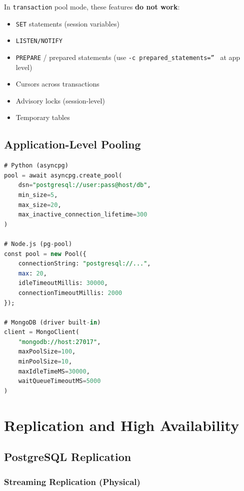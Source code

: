\documentclass[12pt,a4paper]{article}
\begin{document}
\begin{warnbox}
In \texttt{transaction} pool mode, these features \textbf{do not work}:
\begin{itemize}
    \item \texttt{SET} statements (session variables)
    \item \texttt{LISTEN/NOTIFY}
    \item \texttt{PREPARE} / prepared statements (use \texttt{-c prepared\_statements='' } at app level)
    \item Cursors across transactions
    \item Advisory locks (session-level)
    \item Temporary tables
\end{itemize}
\end{warnbox}

\subsection{Application-Level Pooling}

\begin{lstlisting}[language=SQL, caption={Connection pool configuration examples}]
# Python (asyncpg)
pool = await asyncpg.create_pool(
    dsn="postgresql://user:pass@host/db",
    min_size=5,
    max_size=20,
    max_inactive_connection_lifetime=300
)

# Node.js (pg-pool)
const pool = new Pool({
    connectionString: "postgresql://...",
    max: 20,
    idleTimeoutMillis: 30000,
    connectionTimeoutMillis: 2000
});

# MongoDB (driver built-in)
client = MongoClient(
    "mongodb://host:27017",
    maxPoolSize=100,
    minPoolSize=10,
    maxIdleTimeMS=30000,
    waitQueueTimeoutMS=5000
)
\end{lstlisting}


\section{Replication and High Availability}

\subsection{PostgreSQL Replication}

\subsubsection{Streaming Replication (Physical)}
\end{document}
